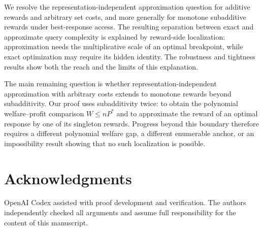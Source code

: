 \documentclass[11pt]{article}
\begin{document}
We resolve the representation-independent approximation question for
additive rewards and arbitrary set costs, and more generally for monotone
subadditive rewards under best-response access.  The resulting separation
between exact and approximate query complexity is explained by reward-side
localization: approximation needs the multiplicative scale of an optimal
breakpoint, while exact optimization may require its hidden identity.  The
robustness and tightness results show both the reach and the limits of this
explanation.

The main remaining question is whether representation-independent
approximation with arbitrary costs extends to monotone rewards beyond
subadditivity.  Our proof uses subadditivity twice: to obtain the polynomial
welfare--profit comparison $W\leq nP^*$ and to approximate the reward of an
optimal response by one of its singleton rewards.  Progress beyond this
boundary therefore requires a different polynomial welfare gap, a different
enumerable anchor, or an impossibility result showing that no such
localization is possible.

\section*{Acknowledgments}
OpenAI Codex assisted with proof development and verification.  The authors
independently checked all arguments and assume full responsibility for the
content of this manuscript.
\end{document}
